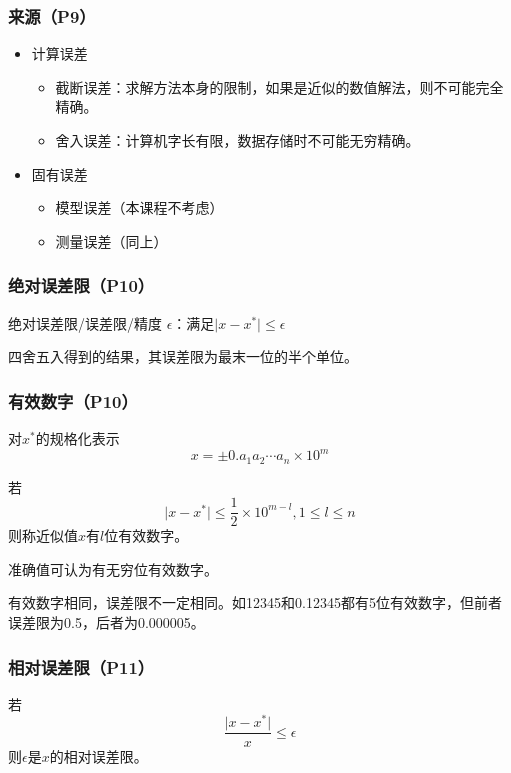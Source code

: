 \documentclass[fontset=ubuntu]{ctexart}
\numberwithin{equation}{section}
\numberwithin{theorem}{section}
\begin{document}
\begin{multicols}{2}
    \subsubsection{来源（P9）}
    \begin{itemize}
        \item 计算误差
        \begin{itemize}
            \item 截断误差：求解方法本身的限制，如果是近似的数值解法，则不可能完全精确。
            \item 舍入误差：计算机字长有限，数据存储时不可能无穷精确。
        \end{itemize}
        \item 固有误差
        \begin{itemize}
            \item 模型误差（本课程不考虑）
            \item 测量误差（同上）
        \end{itemize}
    \end{itemize}
    \subsubsection{绝对误差限（P10）}

    绝对误差限/误差限/精度 $\epsilon$：满足$\lvert x-x^*\rvert\leq\epsilon$\par
    
    四舍五入得到的结果，其误差限为最末一位的半个单位。

    \subsubsection{有效数字（P10）}

    对$x^*$的规格化表示
    \begin{equation}
        x=\pm 0.a_1a_2\cdots a_n\times 10^m
    \end{equation}

    若
    \begin{equation}
        \lvert x-x^*\rvert\leq \frac{1}{2}\times10^{m-l},1\leq l\leq n
    \end{equation}
    则称近似值$x$有$l$位有效数字。

    准确值可认为有无穷位有效数字。

    有效数字相同，误差限不一定相同。如12345和0.12345都有5位有效数字，但前者误差限为0.5，后者为0.000005。
    
    \subsubsection{相对误差限（P11）}

    若
    \begin{equation}
        \frac{\lvert x-x^*\rvert}{x}\leq \epsilon
    \end{equation}
    则$\epsilon$是$x$的相对误差限。

\end{multicols}
\end{document}

